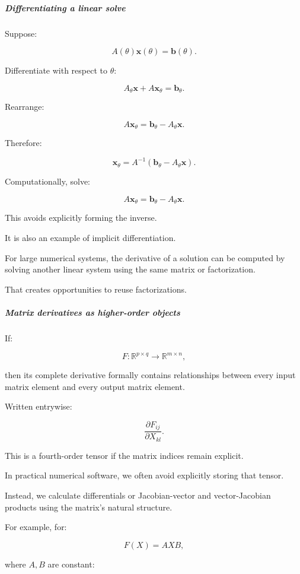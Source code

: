 \subparagraph{Differentiating a linear solve}\label{differentiating-a-linear-solve}

Suppose:

\[
A(\theta)\mathbf x(\theta)=\mathbf b(\theta).
\]

Differentiate with respect to \(\theta\):

\[
A_\theta\mathbf x+A\mathbf x_\theta = \mathbf b_\theta.
\]

Rearrange:

\[
A\mathbf x_\theta= \mathbf b_\theta-A_\theta\mathbf x.
\]

Therefore:

\[
\boxed{ \mathbf x_\theta = A^{-1}(\mathbf b_\theta-A_\theta\mathbf x) }.
\]

Computationally, solve:

\[
\boxed{ A\mathbf x_\theta = \mathbf b_\theta-A_\theta\mathbf x }.
\]

This avoids explicitly forming the inverse.

It is also an example of implicit differentiation.

For large numerical systems, the derivative of a solution can be computed by solving another linear system using the same matrix or factorization.

That creates opportunities to reuse factorizations.

\subparagraph{Matrix derivatives as higher-order objects}\label{matrix-derivatives-as-higher-order-objects}

If:

\[
F:\mathbb R^{p\times q}\rightarrow\mathbb R^{m\times n},
\]

then its complete derivative formally contains relationships between every input matrix element and every output matrix element.

Written entrywise:

\[
\frac{\partial F_{ij}}{\partial X_{kl}}.
\]

This is a fourth-order tensor if the matrix indices remain explicit.

In practical numerical software, we often avoid explicitly storing that tensor.

Instead, we calculate differentials or Jacobian-vector and vector-Jacobian products using the matrix's natural structure.

For example, for:

\[
F(X)=AXB,
\]

where \(A,B\) are constant:

